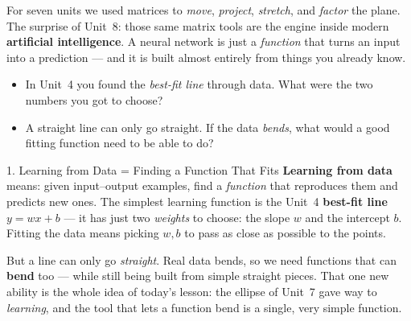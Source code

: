 \documentclass[10pt]{article}
\begin{document}
\begin{hookbox}
For seven units we used matrices to \emph{move}, \emph{project}, \emph{stretch}, and \emph{factor}
the plane. The surprise of Unit~8: those same matrix tools are the engine inside modern
\textbf{artificial intelligence}. A neural network is just a \emph{function} that turns an input into
a prediction --- and it is built almost entirely from things you already know.
\begin{itemize}\setlength{\itemsep}{1pt}
  \item In Unit~4 you found the \emph{best-fit line} through data. What were the two numbers you got to choose? 
  \item A straight line can only go straight. If the data \emph{bends}, what would a good fitting function need to be able to do? 
\end{itemize}
\end{hookbox}

\begin{notesbox}{1. Learning from Data = Finding a Function That Fits}
\textbf{Learning from data} means: given input--output examples, find a \emph{function} that reproduces
them and predicts new ones. The simplest learning function is the Unit~4 \textbf{best-fit line}
$y=wx+b$ --- it has just two \emph{weights} to choose: the slope $w$ and the intercept $b$. Fitting the
data means picking $w,b$ to pass as close as possible to the points.

\vspace{2pt}
But a line can only go \emph{straight}. Real data bends, so we need functions that can \textbf{bend} too
--- while still being built from simple straight pieces. That one new ability is the whole idea of
today's lesson: the ellipse of Unit~7 gave way to \emph{learning}, and the tool that lets a function
bend is a single, very simple function.
\end{notesbox}
\end{document}
